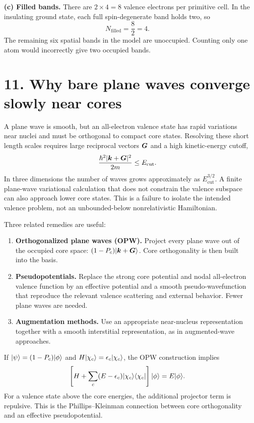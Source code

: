 \textbf{(c) Filled bands.} There are $2\times4=8$ valence electrons per primitive cell. In the insulating ground state, each full spin-degenerate band holds two, so
\[
\boxed{N_{\mathrm{filled}}=\frac82=4.}
\]
The remaining six spatial bands in the model are unoccupied. Counting only one atom would incorrectly give two occupied bands.

\section*{11. Why bare plane waves converge slowly near cores}
A plane wave is smooth, but an all-electron valence state has rapid variations near nuclei and must be orthogonal to compact core states. Resolving these short length scales requires large reciprocal vectors $\boldsymbol{G}$ and a high kinetic-energy cutoff,
\[
\frac{\hbar^2|\boldsymbol{k}+\boldsymbol{G}|^2}{2m}\le E_{\mathrm{cut}}.
\]
In three dimensions the number of waves grows approximately as $E_{\mathrm{cut}}^{3/2}$. A finite plane-wave variational calculation that does not constrain the valence subspace can also approach lower core states. This is a failure to isolate the intended valence problem, not an unbounded-below nonrelativistic Hamiltonian.

Three related remedies are useful:
\begin{enumerate}
\item \textbf{Orthogonalized plane waves (OPW).} Project every plane wave out of the occupied core space: $(1-P_c)\lvert\boldsymbol{k}+\boldsymbol{G}\rangle$. Core orthogonality is then built into the basis.
\item \textbf{Pseudopotentials.} Replace the strong core potential and nodal all-electron valence function by an effective potential and a smooth pseudo-wavefunction that reproduce the relevant valence scattering and external behavior. Fewer plane waves are needed.
\item \textbf{Augmentation methods.} Use an appropriate near-nucleus representation together with a smooth interstitial representation, as in augmented-wave approaches.
\end{enumerate}
If $\lvert\psi\rangle=(1-P_c)\lvert\phi\rangle$ and $H\lvert\chi_c\rangle=\epsilon_c\lvert\chi_c\rangle$, the OPW construction implies
\[
\left[H+\sum_c(E-\epsilon_c)\lvert\chi_c\rangle\langle\chi_c\rvert\right]\lvert\phi\rangle=E\lvert\phi\rangle.
\]
For a valence state above the core energies, the additional projector term is repulsive. This is the Phillips--Kleinman connection between core orthogonality and an effective pseudopotential.

